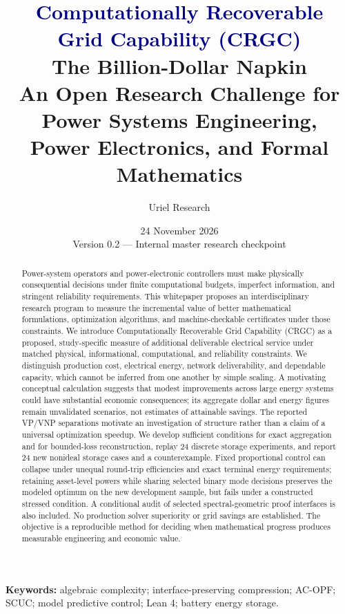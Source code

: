 \documentclass[11pt,letterpaper]{article}
\title{\textcolor{navy}{\bfseries Computationally Recoverable\\Grid Capability (CRGC)}\\[0.5em]
\large The Billion-Dollar Napkin\\[0.2em]
\normalsize An Open Research Challenge for Power Systems Engineering,\\ Power Electronics, and Formal Mathematics}
\author{Uriel Research}
\date{24 November 2026 \\ \small Version 0.2 --- Internal master research checkpoint}
\begin{document}
\maketitle
\begin{abstract}
Power-system operators and power-electronic controllers must make physically consequential decisions under finite computational budgets, imperfect information, and stringent reliability requirements. This whitepaper proposes an interdisciplinary research program to measure the incremental value of better mathematical formulations, optimization algorithms, and machine-checkable certificates under those constraints. We introduce Computationally Recoverable Grid Capability (CRGC) as a proposed, study-specific measure of additional deliverable electrical service under matched physical, informational, computational, and reliability constraints. We distinguish production cost, electrical energy, network deliverability, and dependable capacity, which cannot be inferred from one another by simple scaling. A motivating conceptual calculation suggests that modest improvements across large energy systems could have substantial economic consequences; its aggregate dollar and energy figures remain unvalidated scenarios, not estimates of attainable savings. The reported VP/VNP separations motivate an investigation of structure rather than a claim of a universal optimization speedup. We develop sufficient conditions for exact aggregation and for bounded-loss reconstruction, replay 24 discrete storage experiments, and report 24 new nonideal storage cases and a counterexample. Fixed proportional control can collapse under unequal round-trip efficiencies and exact terminal energy requirements; retaining asset-level powers while sharing selected binary mode decisions preserves the modeled optimum on the new development sample, but fails under a constructed stressed condition. A conditional audit of selected spectral-geometric proof interfaces is also included. No production solver superiority or grid savings are established. The objective is a reproducible method for deciding when mathematical progress produces measurable engineering and economic value.
\end{abstract}

\textbf{Keywords:} algebraic complexity; interface-preserving compression; AC-OPF; SCUC; model predictive control; Lean 4; battery energy storage.
\clearpage
\setcounter{tocdepth}{1}
\hypersetup{bookmarksdepth=2}
\tableofcontents
\clearpage
\end{document}
